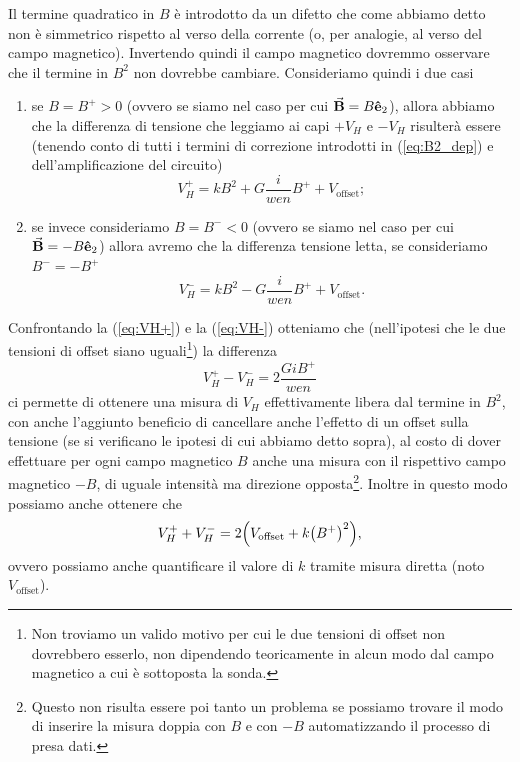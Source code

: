 \documentclass[fleqn,varvw,preprintnumbers,citeautoscript]{memo}
\begin{document}
Il termine quadratico in $B$ è introdotto da un difetto che come abbiamo detto non è simmetrico rispetto al verso della corrente (o, per analogie, al verso del campo magnetico). Invertendo quindi il campo magnetico dovremmo osservare che il termine in $B^2$ non dovrebbe cambiare. Consideriamo quindi i due casi \begin{enumerate}[1.]
    \item se $B=B^+>0$ (ovvero se siamo nel caso per cui $\va{B} = B\vu{e}_2$), allora abbiamo che la differenza di tensione che leggiamo ai capi $+V_H$ e $-V_H$ risulterà essere (tenendo conto di tutti i termini di correzione introdotti in (\ref{eq:B2_dep}) e dell'amplificazione del circuito) \begin{equation}
        V_H^+ = kB^2 + G\frac{i}{wen}B^+ + V_\text{offset};\label{eq:VH+}
    \end{equation}
    \item se invece consideriamo $B=B^-<0$ (ovvero se siamo nel caso per cui $\va{B} = -B\vu{e}_2$) allora avremo che la differenza tensione letta, se consideriamo $B^- = -B^+$ \begin{equation}
        V_H^- = kB^2 - G\frac{i}{wen}B^+ + V_\text{offset}.\label{eq:VH-}
    \end{equation}
\end{enumerate}
Confrontando la (\ref{eq:VH+}) e la (\ref{eq:VH-}) otteniamo che (nell'ipotesi che le due tensioni di offset siano uguali\footnote{Non troviamo un valido motivo per cui le due tensioni di offset non dovrebbero esserlo, non dipendendo teoricamente in alcun modo dal campo magnetico a cui è sottoposta la sonda.}) la differenza \begin{equation}
    V_H^+ - V_H^- = 2\frac{GiB^+}{wen}
\end{equation} ci permette di ottenere una misura di $V_H$ effettivamente libera dal termine in $B^2$, con anche l'aggiunto beneficio di cancellare anche l'effetto di un offset sulla tensione (se si verificano le ipotesi di cui abbiamo detto sopra), al costo di dover effettuare per ogni campo magnetico $B$ anche una misura con il rispettivo campo magnetico $-B$, di uguale intensità ma direzione opposta\footnote{Questo non risulta essere poi tanto un problema se possiamo trovare il modo di inserire la misura doppia con $B$ e con $-B$ automatizzando il processo di presa dati.}. Inoltre in questo modo possiamo anche ottenere che \begin{equation}
    V_H^++V_H^- = 2\qty(V_\text{offset} + k\qty(B^+)^2),
\end{equation} ovvero possiamo anche quantificare il valore di $k$ tramite misura diretta (noto $V_\text{offset}$).
\end{document}
